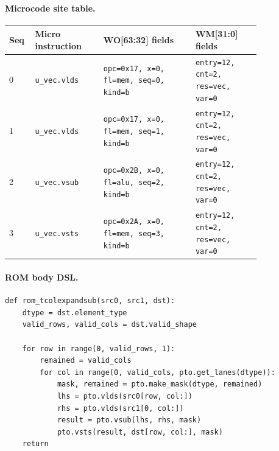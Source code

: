 \paragraph{Microcode site table.}
{\scriptsize
\begin{longtable}{@{}R{0.055\linewidth}L{0.23\linewidth}L{0.31\linewidth}L{0.22\linewidth}@{}}
\toprule
Seq & Micro instruction & WO[63:32] fields & WM[31:0] fields \\
 & \texttt{u\_vec.vlds} & \texttt{opc=0x17, x=0, fl=mem, seq=0, kind=b} & \texttt{entry=12, cnt=2, res=vec, var=0} \\
1 & \texttt{u\_vec.vlds} & \texttt{opc=0x17, x=0, fl=mem, seq=1, kind=b} & \texttt{entry=12, cnt=2, res=vec, var=0} \\
2 & \texttt{u\_vec.vsub} & \texttt{opc=0x2B, x=0, fl=alu, seq=2, kind=b} & \texttt{entry=12, cnt=2, res=vec, var=0} \\
3 & \texttt{u\_vec.vsts} & \texttt{opc=0x2A, x=0, fl=mem, seq=3, kind=b} & \texttt{entry=12, cnt=2, res=vec, var=0} \\
\bottomrule
\end{longtable}
}
\paragraph{ROM body DSL.}
\begin{lstlisting}[style=ptocode]
def rom_tcolexpandsub(src0, src1, dst):
    dtype = dst.element_type
    valid_rows, valid_cols = dst.valid_shape

    for row in range(0, valid_rows, 1):
        remained = valid_cols
        for col in range(0, valid_cols, pto.get_lanes(dtype)):
            mask, remained = pto.make_mask(dtype, remained)
            lhs = pto.vlds(src0[row, col:])
            rhs = pto.vlds(src1[0, col:])
            result = pto.vsub(lhs, rhs, mask)
            pto.vsts(result, dst[row, col:], mask)
    return
\end{lstlisting}
\Needspace{0.34\textheight}

